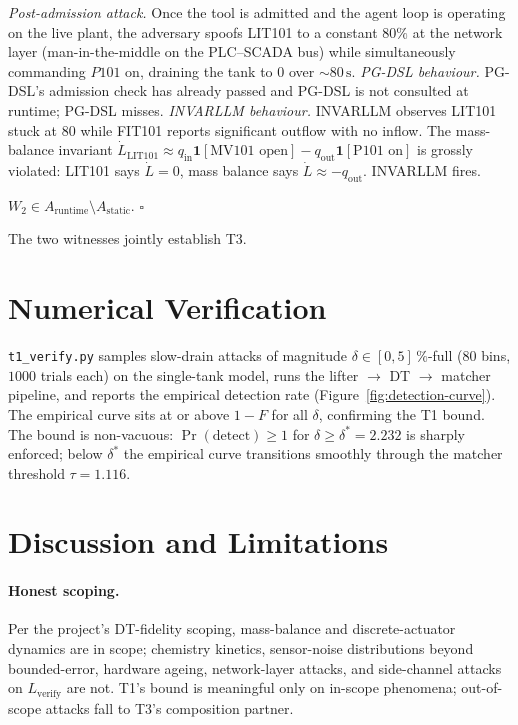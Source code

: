 \documentclass[11pt]{article}
\begin{document}
\textit{Post-admission attack.} Once the tool is admitted and the agent
loop is operating on the live plant, the adversary spoofs LIT101 to a
constant $80\%$ at the network layer (man-in-the-middle on the PLC--SCADA
bus) while simultaneously commanding $P101$ on, draining the tank to $0$
over $\sim 80\,\mathrm{s}$.
\textit{PG-DSL behaviour.} PG-DSL's admission check has already passed and
PG-DSL is not consulted at runtime; PG-DSL misses.
\textit{INVARLLM behaviour.} INVARLLM observes LIT101 stuck at $80$
while FIT101 reports significant outflow with no inflow. The mass-balance
invariant
$\dot L_{\text{LIT101}} \approx q_{\text{in}}\mathbf{1}[\text{MV101 open}]
- q_{\text{out}}\mathbf{1}[\text{P101 on}]$
is grossly violated: LIT101 says $\dot L = 0$, mass balance says
$\dot L \approx -q_{\text{out}}$. INVARLLM fires.

$W_2 \in A_{\text{runtime}} \setminus A_{\text{static}}$. \hfill$\square$

The two witnesses jointly establish T3.

\section{Numerical Verification}
\label{sec:verify}

\texttt{t1\_verify.py} samples slow-drain attacks of magnitude
$\delta \in [0, 5]\,\%$-full ($80$ bins, $1000$ trials each) on the
single-tank model, runs the lifter $\to$ DT $\to$ matcher pipeline, and
reports the empirical detection rate (Figure~\ref{fig:detection-curve}).
The empirical curve sits at or above $1 - F$ for all $\delta$, confirming the
T1 bound. The bound is non-vacuous: $\Pr(\text{detect}) \geq 1$ for
$\delta \geq \delta^{*} = 2.232$ is sharply enforced; below $\delta^{*}$ the
empirical curve transitions smoothly through the matcher threshold
$\tau = 1.116$.

\section{Discussion and Limitations}

\paragraph{Honest scoping.}
Per the project's DT-fidelity scoping, mass-balance and discrete-actuator
dynamics are in scope; chemistry kinetics, sensor-noise distributions
beyond bounded-error, hardware ageing, network-layer attacks, and
side-channel attacks on $L_{\text{verify}}$ are not. T1's bound is
meaningful only on in-scope phenomena; out-of-scope attacks fall to T3's
composition partner.
\end{document}
